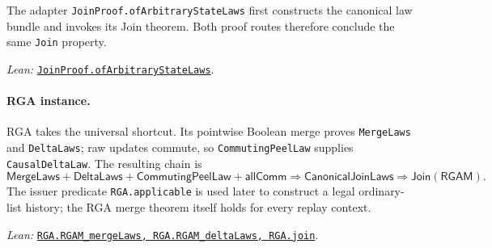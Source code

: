 \documentclass[11pt]{article}
\theoremstyle{definition}
\newcommand{\lean}[1]{\texttt{#1}}
\newcommand{\src}[2]{\href{../../#1}{\texttt{#2}}}
\newcommand{\anchor}[2]{\par\smallskip\noindent\emph{Lean: }\src{#1}{#2}.}
\begin{document}
The adapter \lean{JoinProof.ofArbitraryStateLaws} first constructs the
canonical law bundle and invokes its Join theorem.  Both proof routes therefore
conclude the same \lean{Join} property.
\anchor{Sal/MRDTs/Metatheory/Adequacy.lean}
  {JoinProof.ofArbitraryStateLaws}

\paragraph{RGA instance.}
RGA takes the universal shortcut. Its pointwise Boolean merge proves
\lean{MergeLaws} and \lean{DeltaLaws}; raw updates commute, so
\lean{CommutingPeelLaw} supplies \lean{CausalDeltaLaw}. The resulting chain is
\[
 \mathsf{MergeLaws}+\mathsf{DeltaLaws}
 +\mathsf{CommutingPeelLaw}+\mathsf{allComm}
 \Longrightarrow\mathsf{CanonicalJoinLaws}
 \Longrightarrow\mathsf{Join}(\mathsf{RGAM}).
\]
The issuer predicate \lean{RGA.applicable} is used later to construct a legal
ordinary-list history; the RGA merge theorem itself holds for every replay
context.
\anchor{Sal/MRDTs/Instances/RGA.lean}
  {RGA.RGAM\_mergeLaws, RGA.RGAM\_deltaLaws, RGA.join}



\clearpage
\end{document}
